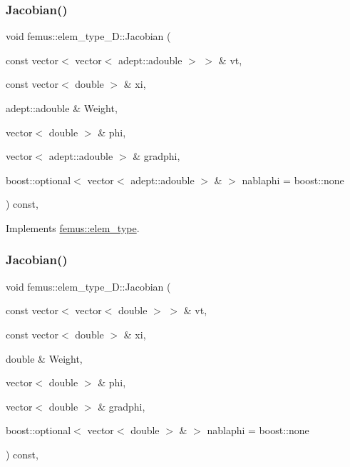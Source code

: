 \subsubsection{\texorpdfstring{Jacobian()}{Jacobian()}\hspace{0.1cm}{\footnotesize\ttfamily [3/4]}}
{\footnotesize\ttfamily void femus\+::elem\+\_\+type\+\_\+D\+::\+Jacobian (\begin{DoxyParamCaption}\item[{const vector$<$ vector$<$ adept\+::adouble $>$ $>$ \&}]{vt,  }\item[{const vector$<$ double $>$ \&}]{xi,  }\item[{adept\+::adouble \&}]{Weight,  }\item[{vector$<$ double $>$ \&}]{phi,  }\item[{vector$<$ adept\+::adouble $>$ \&}]{gradphi,  }\item[{boost\+::optional$<$ vector$<$ adept\+::adouble $>$ \& $>$}]{nablaphi = {\ttfamily boost\+:\+:none} }\end{DoxyParamCaption}) const\hspace{0.3cm}{\ttfamily [inline]}, {\ttfamily [virtual]}}



Implements \mbox{\hyperlink{classfemus_1_1elem__type_a2d76133387cebf896c0e51459055fdea}{femus\+::elem\+\_\+type}}.

\mbox{\label{classfemus_1_1elem__type__1_d_ac6814828a90c49fd5b29df4b5d161653}} 
\subsubsection{\texorpdfstring{Jacobian()}{Jacobian()}\hspace{0.1cm}{\footnotesize\ttfamily [4/4]}}
{\footnotesize\ttfamily void femus\+::elem\+\_\+type\+\_\+D\+::\+Jacobian (\begin{DoxyParamCaption}\item[{const vector$<$ vector$<$ double $>$ $>$ \&}]{vt,  }\item[{const vector$<$ double $>$ \&}]{xi,  }\item[{double \&}]{Weight,  }\item[{vector$<$ double $>$ \&}]{phi,  }\item[{vector$<$ double $>$ \&}]{gradphi,  }\item[{boost\+::optional$<$ vector$<$ double $>$ \& $>$}]{nablaphi = {\ttfamily boost\+:\+:none} }\end{DoxyParamCaption}) const\hspace{0.3cm}{\ttfamily [inline]}, {\ttfamily [virtual]}}



